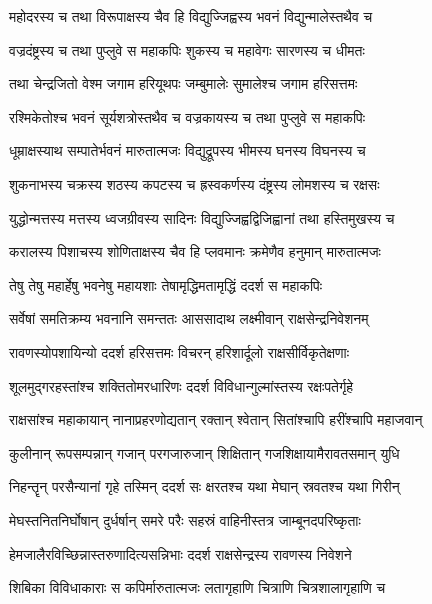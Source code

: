 \twolineshloka
{महोदरस्य च तथा विरूपाक्षस्य चैव हि}
{विद्युज्जिह्वस्य भवनं विद्युन्मालेस्तथैव च} %

\twolineshloka
{वज्रदंष्ट्रस्य च तथा पुप्लुवे स महाकपिः}
{शुकस्य च महावेगः सारणस्य च धीमतः} %

\twolineshloka
{तथा चेन्द्रजितो वेश्म जगाम हरियूथपः}
{जम्बुमालेः सुमालेश्च जगाम हरिसत्तमः} %

\twolineshloka
{रश्मिकेतोश्च भवनं सूर्यशत्रोस्तथैव च}
{वज्रकायस्य च तथा पुप्लुवे स महाकपिः} %

\twolineshloka
{धूम्राक्षस्याथ सम्पातेर्भवनं मारुतात्मजः}
{विद्युद्रूपस्य भीमस्य घनस्य विघनस्य च} %

\twolineshloka
{शुकनाभस्य चक्रस्य शठस्य कपटस्य च}
{ह्रस्वकर्णस्य दंष्ट्रस्य लोमशस्य च रक्षसः} %

\twolineshloka
{युद्धोन्मत्तस्य मत्तस्य ध्वजग्रीवस्य सादिनः}
{विद्युज्जिह्वद्विजिह्वानां तथा हस्तिमुखस्य च} %

\twolineshloka
{करालस्य पिशाचस्य शोणिताक्षस्य चैव हि}
{प्लवमानः क्रमेणैव हनुमान् मारुतात्मजः} %

\twolineshloka
{तेषु तेषु महार्हेषु भवनेषु महायशाः}
{तेषामृद्धिमतामृद्धिं ददर्श स महाकपिः} %

\twolineshloka
{सर्वेषां समतिक्रम्य भवनानि समन्ततः}
{आससादाथ लक्ष्मीवान् राक्षसेन्द्रनिवेशनम्} %

\twolineshloka
{रावणस्योपशायिन्यो ददर्श हरिसत्तमः}
{विचरन् हरिशार्दूलो राक्षसीर्विकृतेक्षणाः} %

\twolineshloka
{शूलमुद्गरहस्तांश्च शक्तितोमरधारिणः}
{ददर्श विविधान्गुल्मांस्तस्य रक्षःपतेर्गृहे} %

\twolineshloka
{राक्षसांश्च महाकायान् नानाप्रहरणोद्यतान्}
{रक्तान् श्वेतान् सितांश्चापि हरींश्चापि महाजवान्} %

\twolineshloka
{कुलीनान् रूपसम्पन्नान् गजान् परगजारुजान्}
{शिक्षितान् गजशिक्षायामैरावतसमान् युधि} %

\twolineshloka
{निहन्तॄन् परसैन्यानां गृहे तस्मिन् ददर्श सः}
{क्षरतश्च यथा मेघान् स्रवतश्च यथा गिरीन्} %

\twolineshloka
{मेघस्तनितनिर्घोषान् दुर्धर्षान् समरे परैः}
{सहस्रं वाहिनीस्तत्र जाम्बूनदपरिष्कृताः} %

\twolineshloka
{हेमजालैरविच्छिन्नास्तरुणादित्यसन्निभाः}
{ददर्श राक्षसेन्द्रस्य रावणस्य निवेशने} %

\twolineshloka
{शिबिका विविधाकाराः स कपिर्मारुतात्मजः}
{लतागृहाणि चित्राणि चित्रशालागृहाणि च} %

